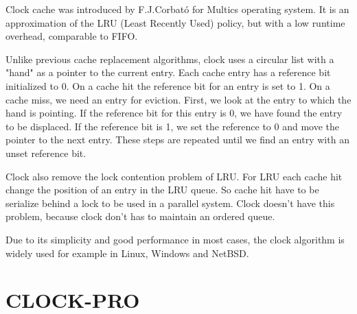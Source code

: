 \documentclass[
	12pt,
	a4paper,
	abstract,
	bibliography=totoc,
	chapterprefix,
	headings=openright,
	numbers=endperiod,
	parskip=half,
	twoside,
]{scrreprt}
\begin{document}
Clock cache was introduced by F.J.Corbató \cite{corbato1968paging} for Multics operating system.
It is an approximation of the LRU (Least Recently Used) policy, but with a low runtime overhead, comparable to FIFO.

Unlike previous cache replacement algorithms, clock uses a circular list with a "hand" as a pointer to the current entry.
Each cache entry has a reference bit initialized to 0.
On a cache hit the reference bit for an entry is set to 1.
On a cache miss, we need an entry for eviction.
First, we look at the entry to which the hand is pointing. If the reference bit for this entry is 0, we have found the entry to be displaced.
If the reference bit is 1, we set the reference to 0 and move the pointer to the next entry.
These steps are repeated until we find an entry with an unset reference bit.


Clock also remove the lock contention problem of LRU.
For LRU each cache hit change the position of an entry in the LRU queue.
So cache hit have to be serialize behind a lock to be used in a parallel system.
Clock doesn't have this problem, because clock don't has to maintain an ordered queue.

Due to its simplicity and good performance in most cases, the clock algorithm is widely used for example in Linux, Windows and NetBSD.


\section{CLOCK-PRO}
\end{document}
